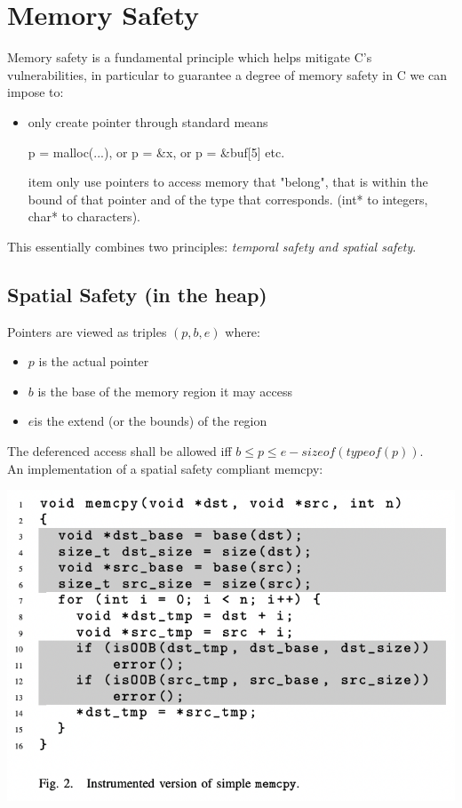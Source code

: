 \documentclass[11pt, oneside]{article}   	%
\begin{document}
\section*{Memory Safety}
Memory safety is a fundamental principle which helps mitigate C's vulnerabilities, in particular to guarantee a degree of memory safety in C we can impose to:
\begin{itemize}
\item only create pointer through standard means
\begin{center}
p  = malloc(...), or p = \&x, or p = \&buf[5] etc.
\end{center}
item only use pointers to access memory that "belong", that is within the bound of that pointer and of the type that corresponds. (int* to integers, char* to characters).
\end{itemize}
This essentially combines two principles: \emph{temporal safety and spatial safety}.


\subsection*{Spatial Safety (in the heap)}
Pointers are viewed as triples $(p, b, e)$ where:
\begin{itemize}
\item $p$ is the actual pointer
\item $b$ is the base of the memory region it may access
\item $e$is the extend (or the bounds) of the region
\end{itemize}
The deferenced access shall be allowed iff $ b \leq p \leq e - sizeof(typeof(p))$. \\ An implementation of a spatial safety compliant memcpy:
\begin{center}
\includegraphics[scale = 0.6]{memsef}
\end{center}
\end{document}
